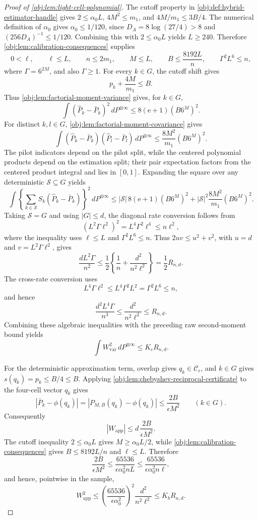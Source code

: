 \documentclass[11pt]{article}
\begin{document}
\begin{proof}[Proof of \cref{obj:lem:light-cell-polynomial}]
The cutoff property in \cref{obj:def:hybrid-estimator-handle} gives \(2\le\alpha_0L\), \(4M^2\le m_1\), and \(4M/m_1\le3B/4\).  The numerical definition of \(\alpha_0\) gives \(\alpha_0\le1/120\), since \(D_A=8\log(27/4)>8\) and \((256D_A)^{-1}\le1/120\).  Combining this with \(2\le\alpha_0L\) yields \(L\ge240\).  Therefore \cref{obj:lem:calibration-consequences} supplies
\[
0<\ell,
\qquad \ell\le L,
\qquad n\le2m_1,
\qquad M\le L,
\qquad B\le\frac{8192L}{n},
\qquad \Gamma^2L^6\le n,
\]
where \(\Gamma=6^{2M}\), and also \(\Gamma\ge1\).  For every \(k\in G\), the cutoff shift gives
\[
p_k+\frac{4M}{m_1}\le B .
\]
Thus \cref{obj:lem:factorial-moment-variance} gives, for \(k\in G\),
\[
\int(\widehat P_k-\bar P_k)^2\,dP^{\otimes\infty}
\le
8(\mathrm e+1)(B6^M)^2.
\]
For distinct \(k,l\in G\), \cref{obj:lem:factorial-moment-covariance} gives
\[
\int(\widehat P_k-\bar P_k)(\widehat P_l-\bar P_l)\,dP^{\otimes\infty}
\le
\frac{8M^2}{m_1}(B6^M)^2 .
\]
The pilot indicators depend on the pilot split, while the centered polynomial products depend on the estimation split; their pair expectation factors from the centered product integral and lies in \([0,1]\).  Expanding the square over any deterministic \(\mathcal S\subseteq G\) yields
\[
\int
\left\{\sum_{k\in \mathcal S}S_k(\widehat P_k-\bar P_k)\right\}^2
\,dP^{\otimes\infty}
\le
|\mathcal S|\,8(\mathrm e+1)(B6^M)^2
+
|\mathcal S|^2\frac{8M^2}{m_1}(B6^M)^2 .
\] %
Taking \(\mathcal S=G\) and using \(|G|\le d\), the diagonal rate conversion follows from
\[
(L^2\Gamma\ell^2)^2=L^4\Gamma^2\ell^4
\le n\ell^2,
\]
where the inequality uses \(\ell\le L\) and \(\Gamma^2L^6\le n\).  Thus \(2uv\le u^2+v^2\), with \(u=d\) and \(v=L^2\Gamma\ell^2\), gives
\[
\frac{dL^2\Gamma}{n^2}
\le
\frac12\left\{\frac1n+\frac{d^2}{n^2\ell^2}\right\}
=
\frac12R_{n,d}.
\]
The cross-rate conversion uses
\[
L^4\Gamma\ell^2\le L^4\Gamma^2L^2=\Gamma^2L^6\le n,
\]
and hence
\[
\frac{d^2L^4\Gamma}{n^3}
\le
\frac{d^2}{n^2\ell^2}
\le R_{n,d}.
\]
Combining these algebraic inequalities with the preceding raw second-moment bound yields
\[
\int W_{\mathrm{var}}^2\,dP^{\otimes\infty}
\le
K_c R_{n,d}.
\] %

For the deterministic approximation term, overlap gives \(q_k\in\mathcal C_\epsilon\), and \(k\in G\) gives \(s(q_k)=p_k\le B/4\le B\).  Applying \cref{obj:lem:chebyshev-reciprocal-certificate} to the four-cell vector \(q_k\) gives
\[
|\bar P_k-\phi(q_k)|
=|P_{M,B}(q_k)-\phi(q_k)|
\le
\frac{2B}{\epsilon M^2}
\qquad (k\in G).
\]
Consequently
\[
|W_{\mathrm{app}}|\le d\,\frac{2B}{\epsilon M^2}.
\]
The cutoff inequality \(2\le\alpha_0L\) gives \(M\ge\alpha_0L/2\), while \cref{obj:lem:calibration-consequences} gives \(B\le8192L/n\) and \(\ell\le L\).  Therefore
\[
\frac{2B}{\epsilon M^2}
\le
\frac{65536}{\epsilon\alpha_0^2 nL}
\le
\frac{65536}{\epsilon\alpha_0^2 n\ell},
\]
and hence, pointwise in the sample,
\[
W_{\mathrm{app}}^2
\le
\left(\frac{65536}{\epsilon\alpha_0^2}\right)^2
\frac{d^2}{n^2\ell^2}
\le K_bR_{n,d}.
\] %


\end{proof}
\end{document}
